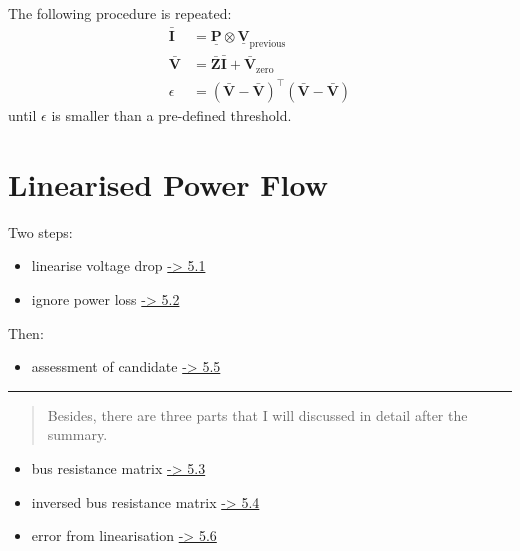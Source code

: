 \documentclass[
]{book}
\providecommand{\tightlist}{%
  \setlength{\itemsep}{0pt}\setlength{\parskip}{0pt}}
\begin{document}
The following procedure is repeated:
\[ \begin{aligned}
    \boldsymbol{\bar{I}} &= \boldsymbol{\underline{P}}
      \otimes \boldsymbol{\underline{V}}_\text{previous} \\
    \boldsymbol{\bar{V}}
    &= \boldsymbol{\bar{Z}} \boldsymbol{\bar{I}}
      + \boldsymbol{\bar{V}}_\text{zero} \\
    \epsilon
    &= \left( \boldsymbol{\bar{V}} - \boldsymbol{\bar{V}} \right)^\top
      \left( \boldsymbol{\bar{V}} - \boldsymbol{\bar{V}} \right)
\end{aligned} \]
until \(\epsilon\) is smaller than a pre-defined threshold.

\hypertarget{linearised-power-flow}{%
\chapter{Linearised Power Flow}\label{linearised-power-flow}}

Two steps:

\begin{itemize}
\tightlist
\item
  linearise voltage drop \protect\hyperlink{linearVoltageDrop}{-\textgreater{} 5.1}
\item
  ignore power loss \protect\hyperlink{linearVoltage}{-\textgreater{} 5.2}
\end{itemize}

Then:

\begin{itemize}
\tightlist
\item
  assessment of candidate \protect\hyperlink{assessment}{-\textgreater{} 5.5}
\end{itemize}

\begin{center}\rule{0.5\linewidth}{0.5pt}\end{center}

\begin{quote}
Besides, there are three parts that I will discussed in detail after the
summary.
\end{quote}

\begin{itemize}
\tightlist
\item
  bus resistance matrix \protect\hyperlink{BRM}{-\textgreater{} 5.3}
\item
  inversed bus resistance matrix \protect\hyperlink{brmInv}{-\textgreater{} 5.4}
\item
  error from linearisation \protect\hyperlink{error}{-\textgreater{} 5.6}
\end{itemize}
\end{document}
